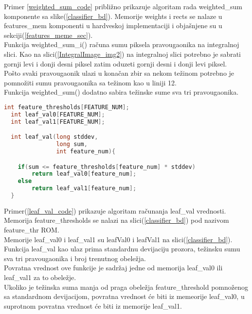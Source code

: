 Primer \ref{weighted_sum_code} približno prikazuje algoritam rada weighted\_sum
komponente sa slike(\ref{classifier_bd}).
Memorije weights i rects se nalaze u features\_mem komponenti u hardveskoj
implementaciji i objašnjene su u sekciji(\ref{features_meme_sec}).\\

Funkcija weighted\_sum\_i() računa sumu piksela pravougaonika na integralnoj slici.
Kao na slici(\ref{IntegralImage_img2}) na integralnoj slici potrebno je sabrati
gornji levi i donji desni piksel zatim oduzeti gornji desni i donji levi
piksel.\\
Pošto svaki pravougaonik ulazi u konačan zbir sa nekom težinom potrebno je
pomnožiti sumu pravougaonika sa težinom kao u liniji 12. \\

Funkcija weighted\_sum() dodatno sabira težinske sume sva tri pravougaonika.

\newpage

\begin{lstlisting}[language=C++,caption={Leaf\_val u \textbf{C}-u},captionpos=b, label=leaf_val_code]
  int feature_thresholds[FEATURE_NUM];
  int leaf_val0[FEATURE_NUM];
  int leaf_val1[FEATURE_NUM];

  int leaf_val(long stddev,
               long sum,
               int feature_num){

    if(sum <= feature_thresholds[feature_num] * stddev)
        return leaf_val0[feature_num];
    else
        return leaf_val1[feature_num];
  }
\end{lstlisting}

Primer(\ref{leaf_val_code}) prikazuje algoritam računanja leaf\_val vrednosti. \\
Memorija feature\_thresholds se nalazi na slici(\ref{classifier_bd}) pod nazivom
feature\_thr ROM. \\
Memorije leaf\_val0 i leaf\_val1 su leafVal0 i leafVal1 na
slici(\ref{classifier_bd}). \\

Funkcija leaf\_val kao ulaz prima standardnu devijaciju prozora, težinsku sumu
sva tri pravougaonika i broj trenutnog obeležja. \\
Povratna vrednost ove funkcije je sadržaj jedne od memorija leaf\_val0 ili
leaf\_val1 za to obeležje. \\

Ukoliko je težinska suma manja od praga obeležja feature\_threshold
pomnoženog sa standardnom devijacijom, povratna vrednost će biti iz memeorije
leaf\_val0, u suprotnom povratna vrednost će biti iz memorije leaf\_val1. \\

